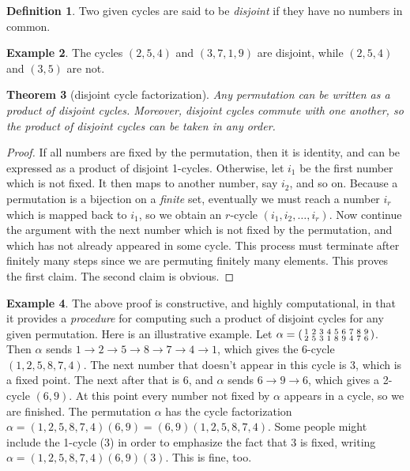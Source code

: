 \documentclass[11pt]{article}
\newtheorem{thm}{Theorem}[section]
\theoremstyle{definition}
\newtheorem{defn}[thm]{Definition}
\newtheorem{example}[thm]{Example}
\newenvironment{perm}[2]{\left(\begin{smallmatrix}#1 \\ #2}{\end{smallmatrix}\right)}
\begin{document}
\begin{defn}
Two given cycles are said to be {\em disjoint} if they have no numbers
in common. 
\end{defn} 

\begin{example}
The cycles $(2,5,4)$ and $(3,7,1,9)$ are disjoint, while $(2,5,4)$ and
$(3,5)$ are not.
\end{example}



\begin{thm}[disjoint cycle factorization] \label{B:disj}
  Any permutation can be written as a product of disjoint
  cycles. Moreover, disjoint cycles commute with one another, so the
  product of disjoint cycles can be taken in any order.
\end{thm}

\begin{proof}
If all numbers are fixed by the permutation, then it is identity, and
can be expressed as a product of disjoint 1-cycles. Otherwise, let
$i_1$ be the first number which is not fixed. It then maps to another
number, say $i_2$, and so on. Because a permutation is a bijection on
a \emph{finite} set, eventually we must reach a number $i_r$ which is
mapped back to $i_1$, so we obtain an $r$-cycle $(i_1,i_2,\dots,
i_r)$. Now continue the argument with the next number which is not
fixed by the permutation, and which has not already appeared in some
cycle. This process must terminate after finitely many steps since we
are permuting finitely many elements. This proves the first claim. The
second claim is obvious.
\end{proof}


\begin{example}
The above proof is constructive, and highly computational, in that it
provides a \emph{procedure} for computing such a product of disjoint
cycles for any given permutation. Here is an illustrative example. Let
$\alpha = \begin{perm} {1&2&3&4&5&6&7&8&9}
  {2&5&3&1&8&9&4&7&6}\end{perm}$.  Then $\alpha$ sends $1\to 2 \to 5
\to 8 \to 7 \to 4 \to 1$, which gives the 6-cycle $(1,2,5,8,7,4)$. The
next number that doesn't appear in this cycle is 3, which is a fixed
point. The next after that is 6, and $\alpha$ sends $6 \to 9 \to 6$,
which gives a 2-cycle $(6,9)$. At this point every number not fixed by
$\alpha$ appears in a cycle, so we are finished.  The permutation
$\alpha$ has the cycle factorization $\alpha = (1,2,5,8,7,4)(6,9)
=(6,9)(1,2,5,8,7,4)$. Some people might include the 1-cycle (3) in
order to emphasize the fact that 3 is fixed, writing $\alpha =
(1,2,5,8,7,4)(6,9)(3)$. This is fine, too.
\end{example}
\end{document}
